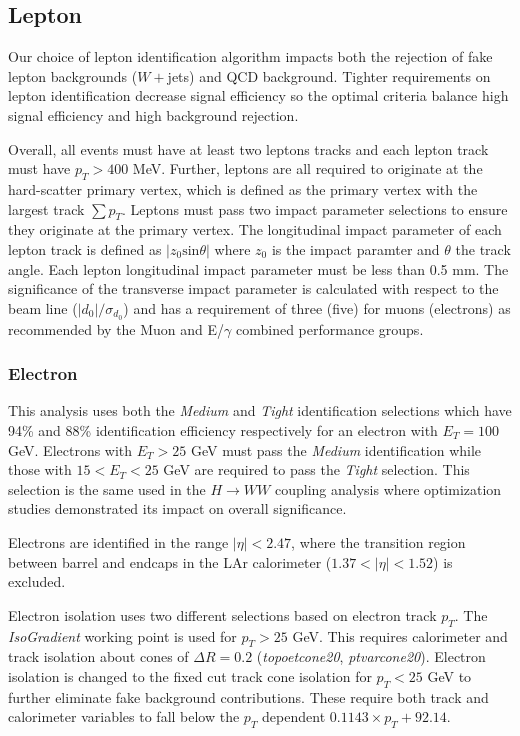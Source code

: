\subsection{Lepton}

Our choice of lepton identification algorithm impacts both the rejection of fake lepton backgrounds ($W+$jets) and QCD background. Tighter requirements on lepton identification decrease signal efficiency so the optimal criteria balance high signal efficiency and high background rejection.

Overall, all events must have at least two leptons tracks and each lepton track must have $p_T>400$ MeV. Further, leptons are all required to originate at the hard-scatter primary vertex, which is defined as the primary vertex with the largest track $\sum p_T$. Leptons must pass two impact parameter selections to ensure they originate at the primary vertex. The longitudinal impact parameter of each lepton track is defined as $|z_0\mathrm{sin}\theta|$ where $z_0$ is the impact paramter and $\theta$ the track angle. Each lepton longitudinal impact parameter must be less than 0.5 mm. The significance of the transverse impact parameter is calculated with respect to the beam line ($|d_0|/\sigma_{d_0}$) and has a requirement of three (five) for muons (electrons) as recommended by the Muon and E/$\gamma$ combined performance groups. 

\subsubsection{Electron}
This analysis uses both the \textit{Medium} and \textit{Tight} identification selections which have 94\% and 88\% identification efficiency respectively for an electron with $E_T=100$  GeV. Electrons with $E_T>25$ GeV must pass the \textit{Medium} identification while those with $15<E_T<25$ GeV are required to pass the \textit{Tight} selection. This selection is the same used in the $H\rightarrow WW$ coupling analysis where optimization studies demonstrated its impact on overall significance. 

Electrons are identified in the range $|\eta|<2.47$, where the transition region between barrel and endcaps in the LAr calorimeter ($1.37<|\eta|<1.52$) is excluded.

Electron isolation uses two different selections based on electron track $p_T$. The \textit{IsoGradient} working point is used for $p_T>25$ GeV. This requires calorimeter and track isolation about cones of $\Delta R =0.2$ (\textit{topoetcone20}, \textit{ptvarcone20}). Electron isolation is changed to the fixed cut track cone isolation for $p_T <25$ GeV to further eliminate fake background contributions. These require both track and calorimeter variables to fall below the $p_T$ dependent $0.1143\times p_T + 92.14$. 

